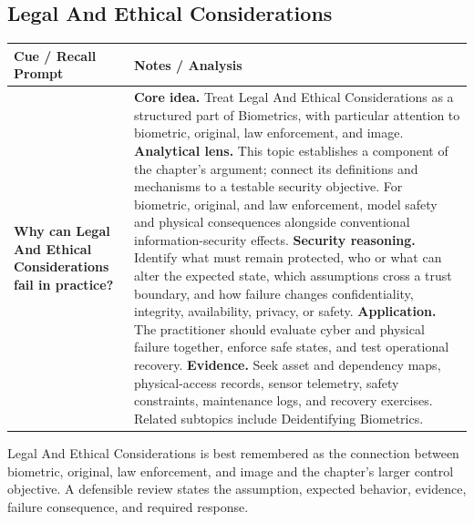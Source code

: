 \documentclass[11pt]{article}
\newcommand{\CornellHeader}{%
\rowcolor{Navy}\color{white}\bfseries Cue / Recall Prompt & \color{white}\bfseries Notes / Analysis\\\hline}
\newcommand{\CornellRow}[2]{%
\cellcolor{CueGray}\RaggedRight\textbf{#1} & \RaggedRight #2\\\hline}
\begin{document}
\subsection*{Legal And Ethical Considerations}
\begin{longtable}{>{\RaggedRight\arraybackslash}p{}|>{\RaggedRight\arraybackslash}p{}}
\CornellHeader
\CornellRow{Why can Legal And Ethical Considerations fail in practice?}{\textbf{Core idea.} Treat Legal And Ethical Considerations as a structured part of Biometrics, with particular attention to biometric, original, law enforcement, and image. \textbf{Analytical lens.} This topic establishes a component of the chapter's argument; connect its definitions and mechanisms to a testable security objective. For biometric, original, and law enforcement, model safety and physical consequences alongside conventional information-security effects. \textbf{Security reasoning.} Identify what must remain protected, who or what can alter the expected state, which assumptions cross a trust boundary, and how failure changes confidentiality, integrity, availability, privacy, or safety. \textbf{Application.} The practitioner should evaluate cyber and physical failure together, enforce safe states, and test operational recovery. \textbf{Evidence.} Seek asset and dependency maps, physical-access records, sensor telemetry, safety constraints, maintenance logs, and recovery exercises. Related subtopics include Deidentifying Biometrics.}
\end{longtable}
\begin{topicsummary}
Legal And Ethical Considerations is best remembered as the connection between biometric, original, law enforcement, and image and the chapter's larger control objective. A defensible review states the assumption, expected behavior, evidence, failure consequence, and required response.
\end{topicsummary}
\end{document}
